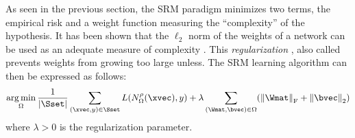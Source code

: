 As seen in the previous section, the SRM paradigm minimizes two terms, the empirical risk and a weight function measuring the ``complexity'' of the hypothesis.
It has been shown that the $\ell_2$ norm of the weights of a network can be used as an adequate measure of complexity \cite{hinton1987learning}.
This \emph{regularization} \cite{tikhonov1977solutions}, also called prevents weights from growing too large unless.
The SRM learning algorithm can then be expressed as follows:
\begin{equation}
  \argmin_{\weights} \frac{1}{|\Sset|} \sum_{(\xvec, y) \in \Sset} L(N^\act_\weights(\xvec), y) + \lambda \sum_{(\Wmat, \bvec) \in \weights} \left( \norm{\Wmat}_\mathrm{F} + \norm{\bvec}_\mathrm{2} \right)
\end{equation}
where $\lambda > 0$ is the regularization parameter.


